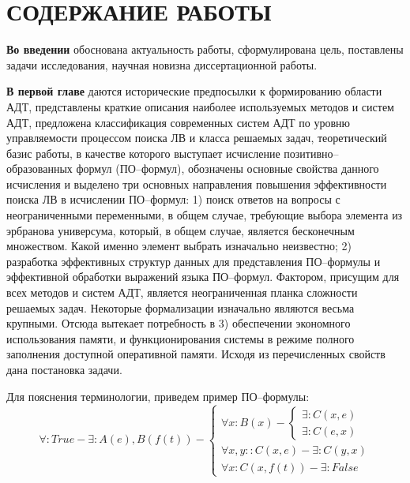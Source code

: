 \documentclass[a4paper]{report}
\begin{document}
\section*{СОДЕРЖАНИЕ РАБОТЫ}


\textbf{Во введении} обоснована актуальность работы, сформулирована цель, поставлены задачи исследования, научная новизна диссертационной работы.


\textbf{В первой главе} даются исторические предпосылки к формированию области АДТ, представлены краткие описания наиболее используемых методов и систем АДТ,  предложена классификация современных систем АДТ по уровню управляемости процессом поиска ЛВ и класса решаемых задач, теоретический базис работы, в качестве которого выступает исчисление позитивно--образованных формул (ПО--формул), обозначены основные свойства данного исчисления и выделено три основных направления повышения эффективности поиска ЛВ в исчислении ПО--формул: 1) поиск ответов на вопросы с неограниченными переменными, в общем случае, требующие выбора элемента из эрбранова универсума, который, в общем случае, является бесконечным множеством. Какой именно элемент выбрать изначально неизвестно; 2) разработка эффективных структур данных для представления ПО--формулы и эффективной обработки выражений языка ПО--формул. Фактором, присущим для всех методов и систем АДТ, является неограниченная планка сложности решаемых задач. Некоторые формализации изначально являются весьма крупными. Отсюда вытекает потребность в 3) обеспечении экономного использования памяти, и функционирования системы в режиме полного заполнения доступной оперативной памяти. Исходя из перечисленных свойств дана постановка задачи.

Для пояснения терминологии, приведем пример ПО--формулы:
$$
\forall\colon True - \exists: A(e),B(f(t)) - \left\{
\begin{array}{lcl}
 \forall x \colon B(x) - \left\{
     \begin{array}{lcl}
     \exists \colon C(x,e) \\
     \exists \colon C(e,x)
    \end{array}\right. \\
 \forall x,y \colon \colon C(x,e) - \exists : C(y,x) \\
 \forall x \colon C(x,f(t)) - \exists : False
\end{array}
\right. 
$$ 
\end{document}

